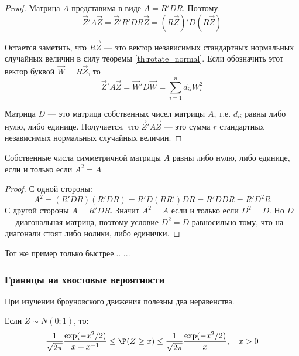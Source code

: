 \begin{proof}
Матрица $A$ представима в виде $A=R'DR$. Поэтому:
\begin{equation}
\vec{Z}'A\vec{Z}=\vec{Z}'R'DR\vec{Z}=(R\vec{Z})'D(R\vec{Z})
\end{equation}

Остается заметить, что $R\vec{Z}$ --- это вектор независимых стандартных нормальных случайных величин в силу теоремы \ref{th:rotate_normal}. Если обозначить этот вектор буквой $\vec{W}=R\vec{Z}$, то
\begin{equation}
\vec{Z}'A\vec{Z}=\vec{W}'D\vec{W}=\sum_{i=1}^{n}d_{ii}W_{i}^{2}
\end{equation}

Матрица $D$ --- это матрица собственных чисел матрицы $A$, т.е. $d_{ii}$ равны либо нулю, либо единице. Получается, что $\vec{Z}'A\vec{Z}$ --- это сумма $r$ стандартных независимых нормальных случайных величин.
\end{proof}


\begin{myth}
Собственные числа симметричной матрицы $A$ равны либо нулю, либо единице, если и только если  $A^{2}=A$
\end{myth}

\begin{proof}
С одной стороны:
\begin{equation}
A^{2}=(R'DR)(R'DR)=R'D(RR')DR=R'DDR=R'D^{2}R
\end{equation}
С другой стороны $A=R'DR$. Значит $A^{2}=A$ если и только если $D^{2}=D$. Но $D$ --- диагональная матрица, поэтому условие $D^{2}=D$ равносильно тому, что на диагонали стоят либо нолики, либо единички.
\end{proof}


\begin{myex}
Тот же пример только быстрее...
...

\end{myex}


\subsubsection*{Границы на хвостовые вероятности}
При изучении броуновского движения полезны два неравенства.

\begin{myth} Если $Z\sim N(0;1)$, то:
\begin{equation}
\frac{1}{\sqrt{2\pi}}\frac{\exp(-x^{2}/2)}{x+x^{-1}}\leq \P(Z\geq x)\leq \frac{1}{\sqrt{2\pi}}\frac{\exp(-x^{2}/2)}{x}, \quad x>0
\end{equation}
\end{myth}

